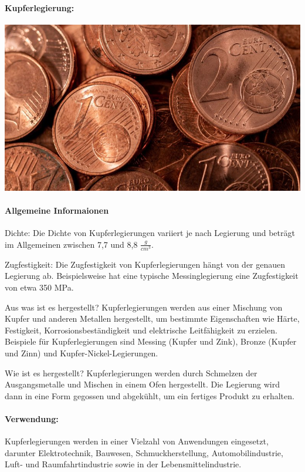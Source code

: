 \documentclass{article}
\begin{document}
\begin{multicols}{3}

\paragraph{Kupferlegierung:}
\includegraphics[width=\linewidth]{copper.jpg}
\paragraph{Allgemeine Informaionen} Dichte: Die Dichte von Kupferlegierungen
variiert je nach Legierung und beträgt im Allgemeinen zwischen 7,7 und 8,8 $\frac{g}{cm^3}$.

Zugfestigkeit: Die Zugfestigkeit von Kupferlegierungen hängt von der genauen
Legierung ab. Beispielsweise hat eine typische Messinglegierung eine
Zugfestigkeit von etwa 350 MPa.

Aus was ist es hergestellt? Kupferlegierungen werden aus einer Mischung von
Kupfer und anderen Metallen hergestellt, um bestimmte Eigenschaften wie Härte,
Festigkeit, Korrosionsbeständigkeit und elektrische Leitfähigkeit zu erzielen.
Beispiele für Kupferlegierungen sind Messing (Kupfer und Zink), Bronze (Kupfer
und Zinn) und Kupfer-Nickel-Legierungen.

Wie ist es hergestellt? Kupferlegierungen werden durch Schmelzen der
Ausgangsmetalle und Mischen in einem Ofen hergestellt. Die Legierung wird dann
in eine Form gegossen und abgekühlt, um ein fertiges Produkt zu erhalten.

\paragraph{Verwendung:}
\begin{compactitem}
\item Kupferlegierungen werden in einer Vielzahl von Anwendungen eingesetzt,
  darunter Elektrotechnik, Bauwesen, Schmuckherstellung, Automobilindustrie,
  Luft- und Raumfahrtindustrie sowie in der Lebensmittelindustrie.
\end{compactitem}


\end{multicols}
\end{document}
